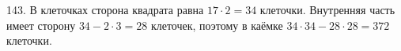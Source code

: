 143. В клеточках сторона квадрата равна $17\cdot2=34$ клеточки. Внутренняя часть имеет сторону $34-2\cdot3=28$ клеточек, поэтому в каёмке $34\cdot34-28\cdot28=372$ клеточки.\\
